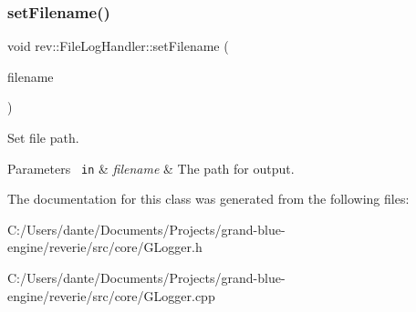 \subsubsection{\texorpdfstring{setFilename()}{setFilename()}}
{\footnotesize\ttfamily void rev\+::\+File\+Log\+Handler\+::set\+Filename (\begin{DoxyParamCaption}\item[{\mbox{\hyperlink{classrev_1_1_g_string}{G\+String}} \&}]{filename }\end{DoxyParamCaption})\hspace{0.3cm}{\ttfamily [inline]}}



Set file path. 


\begin{DoxyParams}[1]{Parameters}
\mbox{\texttt{ in}}  & {\em filename} & The path for output. \\
\hline
\end{DoxyParams}


The documentation for this class was generated from the following files\+:\begin{DoxyCompactItemize}
\item 
C\+:/\+Users/dante/\+Documents/\+Projects/grand-\/blue-\/engine/reverie/src/core/G\+Logger.\+h\item 
C\+:/\+Users/dante/\+Documents/\+Projects/grand-\/blue-\/engine/reverie/src/core/G\+Logger.\+cpp\end{DoxyCompactItemize}
